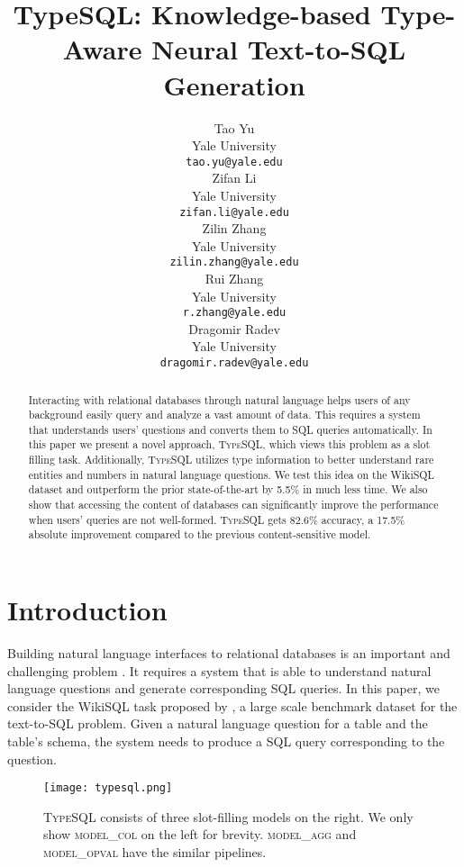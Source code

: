 \documentclass[11pt,a4paper]{article}
\title{TypeSQL: Knowledge-based Type-Aware Neural Text-to-SQL Generation}
\author{Tao Yu \\
  Yale University \\
  {\tt tao.yu@yale.edu} \\\And
  Zifan Li \\
  Yale University \\
  {\tt zifan.li@yale.edu} \\ \And
  Zilin Zhang \\
  Yale University \\
  {\tt zilin.zhang@yale.edu} \\ \AND
  Rui Zhang \\
  Yale University \\
  {\tt r.zhang@yale.edu} \\ \And
  Dragomir Radev \\
  Yale University \\
  {\tt dragomir.radev@yale.edu} \\}
\date{}
\begin{document}
\maketitle

\begin{abstract}
Interacting with relational databases through natural language helps users of any background easily query and analyze a vast amount of data. This requires a system that understands users' questions and converts them to SQL queries automatically.
In this paper we present a novel approach, \textsc{TypeSQL}, which views this problem as a slot filling task.
Additionally, \textsc{TypeSQL} utilizes type information to better understand rare entities and numbers in natural language questions.
We test this idea on the WikiSQL dataset and outperform the prior state-of-the-art by 5.5\% in much less time. We also show that accessing the content of databases can significantly improve the performance when users' queries are not well-formed. \textsc{TypeSQL} gets 82.6\% accuracy, a 17.5\% absolute improvement compared to the previous content-sensitive model.
\end{abstract}


\section{Introduction}

Building natural language interfaces to relational databases is an important and challenging problem \cite{li2014constructing,pasupat2015compositional,Yin15,Zhong2017,Yaghmazadeh17,Xu2017,Wang2017}.
It requires a system that is able to understand natural language questions and generate corresponding SQL queries.
In this paper, we consider the WikiSQL task proposed by , a large scale benchmark dataset for the text-to-SQL problem. Given a natural language question for a table and the table's schema, the system needs to produce a SQL query corresponding to the question.

\begin{figure*}[th!]
\centering
\texttt{[image: typesql.png]}

\caption{\textsc{TypeSQL} consists of three slot-filling models on the right. We only show \textsc{model\_col} on the left for brevity. \textsc{model\_agg} and \textsc{model\_opval} have the similar pipelines.}
\label{fig:model}

\end{figure*}
\end{document}
